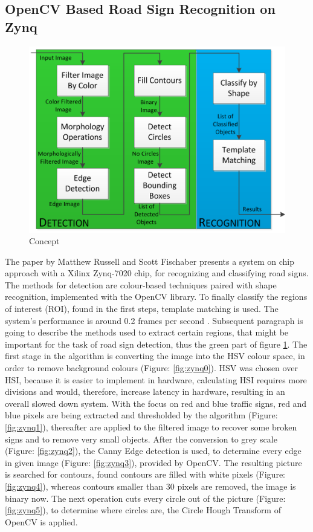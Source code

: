 \subsection{OpenCV Based Road Sign Recognition on Zynq}\label{zynq}
\begin{figure}[H]
	\centering
	\includegraphics[width=\linewidth]{images/zynqconcept.png}
	\caption{Concept \cite{zynq}}\label{fig:zynq}
	\endminipage\hfill
\end{figure}
The paper by Matthew Russell and Scott Fischaber presents a system on chip approach with a Xilinx Zynq-7020 chip, for recognizing and classifying road signs. The methods for detection are colour-based techniques paired with shape recognition, implemented with the OpenCV library. To finally classify the regions of interest (ROI), found in the first steps, template matching is used. The system's performance is around 0.2 frames per second \cite{zynq}. Subsequent paragraph is going to describe the methods used to extract certain regions, that might be important for the task of road sign detection, thus the green part of figure \ref{fig:zynq}. \newline
The first stage in the algorithm is
converting the image into the HSV colour space, in order to remove background colours (Figure: \ref{fig:zynq0}). HSV was chosen over HSI, because it is easier to implement in hardware, calculating  HSI requires more divisions and would, therefore, increase latency in hardware, resulting in an overall slowed down system. With the focus on red and blue traffic signs, red and blue pixels are being extracted and thresholded by the algorithm (Figure: \ref{fig:zynq1}), thereafter are applied to the filtered image to recover some broken signs and to remove very small objects. After the conversion to grey scale (Figure: \ref{fig:zynq2}), the Canny Edge detection is used, to determine every edge in given image (Figure: \ref{fig:zynq3}), provided by OpenCV. The resulting picture is searched for contours, found contours are filled with white pixels (Figure: \ref{fig:zynq4}), whereas contours smaller than 30 pixels are removed, the image is binary now. The next operation cuts every circle out of the picture (Figure: \ref{fig:zynq5}), to determine where circles are, the Circle Hough Transform of OpenCV is applied.
